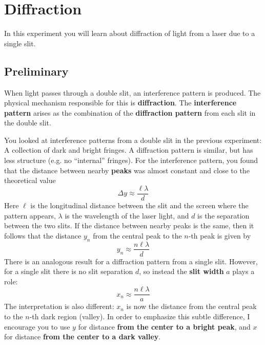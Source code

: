 \setcounter{chapter}{9}
\chapter{Diffraction}
%
In this experiment you will learn about diffraction of light from a laser due to a single slit.
%
\section{Preliminary}
%
When light passes through a double slit, an interference pattern is produced. The physical mechanism responsible for this is \textbf{diffraction}. The \textbf{interference pattern} arises as the combination of the \textbf{diffraction pattern} from each slit in the double slit.

You looked at interference patterns from a double slit in the previous experiment: A collection of dark and bright fringes. A diffraction pattern is similar, but has less structure (e.g. no ``internal'' fringes). For the interference pattern, you found that the distance between nearby \textbf{peaks} was almost constant and close to the theoretical value
\begin{equation}
    \Delta y \approx \frac{\ell \lambda}{d}
\end{equation}
Here $\ell$ is the longitudinal distance between the slit and the screen where the pattern appears, $\lambda$ is the wavelength of the laser light, and $d$ is the separation between the two slits. If the distance between nearby peaks is the same, then it follows that the distance $y_{n}$ from the central peak to the $n$-th peak is given by
\begin{equation}
    y_{n} \approx \frac{n \ell \lambda}{d}
\end{equation}
There is an analogous result for a diffraction pattern from a single slit. However, for a single slit there is no slit separation $d$, so instead the \textbf{slit width} $a$ plays a role:
\begin{equation}
    x_{n} \approx \frac{n \ell \lambda}{a}
\end{equation}
The interpretation is also different: $x_{n}$ is now the distance from the central peak to the $n$-th dark region (valley). In order to emphasize this subtle difference, I encourage you to use $y$ for distance \textbf{from the center to a bright peak}, and $x$ for distance \textbf{from the center to a dark valley}.
%
